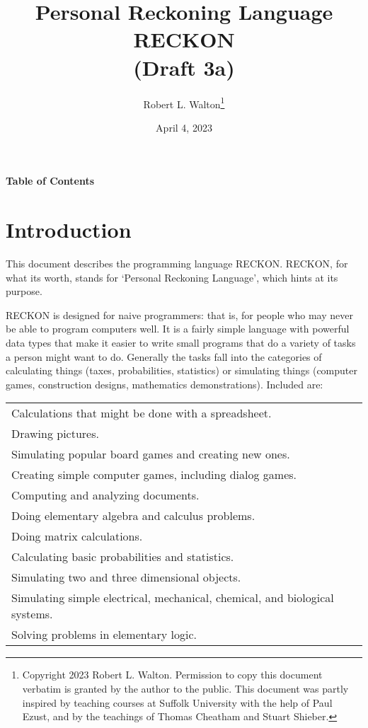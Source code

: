 \documentclass[12pt]{article}
\makeatletter
\renewcommand\tableofcontents{%
    \begin{list}{}%
	     {\setlength{\itemsep}{0in}%
	      \setlength{\topsep}{0in}%
	      \setlength{\parsep}{1ex}%
	      \setlength{\labelwidth}{0in}%
	      \setlength{\baselineskip}{1.5ex}%
	      \setlength{\leftmargin}{0.8in}%
	      \setlength{\rightmargin}{0.8in}}%
    \item\@starttoc{toc}%
    \end{list}}
\makeatother
\begin{document}
        
\title{Personal Reckoning Language\\[2ex]
       RECKON\\[2ex]
       (Draft 3a)}

\author{Robert L. Walton\thanks{Copyright 2023 Robert L. Walton.
Permission to copy this document verbatim is granted by the author
to the public.  This document was partly inspired
by teaching courses at Suffolk University with the help of
Paul Ezust, and by the teachings of Thomas
Cheatham and Stuart Shieber.}}

\date{April 4, 2023}

\maketitle

\newpage
\begin{center}
\large \bf Table of Contents
\end{center}

\bigskip

\tableofcontents 

\newpage

\section{Introduction}

This document describes the programming language RECKON.  RECKON,
for what its worth, stands for `Personal Reckoning Language',
which hints at its purpose.

RECKON is designed for naive programmers: that is, for people who may never
be able to program computers well.  It is a fairly simple language with
powerful data types that make it easier to write small programs
that do a variety of tasks a person might want to do.  Generally
the tasks fall into the categories of calculating things (taxes,
probabilities, statistics) or simulating things
(computer games, construction designs, mathematics demonstrations).
Included are:

\begin{center}
\begin{tabular}{l}
Calculations that might be done with a spreadsheet. \\
Drawing pictures. \\
Simulating popular board games and creating new ones. \\
Creating simple computer games, including dialog games. \\
Computing and analyzing documents. \\
Doing elementary algebra and calculus problems. \\
Doing matrix calculations. \\ 
Calculating basic probabilities and statistics. \\
Simulating two and three dimensional objects. \\
Simulating simple electrical, mechanical, chemical, and biological systems.\\
Solving problems in elementary logic. \\
\end{tabular}
\end{center}
\end{document}
